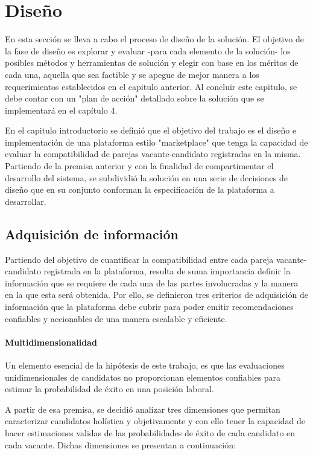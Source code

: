 \chapter{Diseño}
	En esta sección se lleva a cabo el proceso de diseño de la solución. El objetivo de la fase de diseño es explorar y evaluar -para cada elemento de la solución- los posibles métodos y herramientas de solución y elegir con base en los méritos de cada una, aquella que sea factible y se apegue de mejor manera a los requerimientos establecidos en el capitulo anterior. Al concluir este capitulo, se debe contar con un "plan de acción" detallado sobre la solución que se implementará en el capítulo 4.

	En el capitulo introductorio se definió que el objetivo del trabajo es el diseño e implementación de una plataforma estilo "marketplace" que tenga la capacidad de evaluar la compatibilidad de parejas vacante-candidato registradas en la misma. Partiendo de la premisa anterior y con la finalidad de compartimentar el desarrollo del sistema, se subdividió la solución en una serie de decisiones de diseño que en su conjunto conforman la especificación de la plataforma a desarrollar.

	\section{Adquisición de información}
		Partiendo del objetivo de cuantificar la compatibilidad entre cada pareja vacante-candidato registrada en la plataforma, resulta de suma importancia definir la información que se requiere de cada una de las partes involucradas y la manera en la que esta será obtenida. Por ello, se definieron tres criterios de adquisición de información que la plataforma debe cubrir para poder emitir recomendaciones confiables y accionables de una manera escalable y eficiente.

		\subsubsection{Multidimensionalidad}
			Un elemento esencial de la hipótesis de este trabajo, es que las evaluaciones unidimensionales de candidatos no proporcionan elementos confiables para estimar la probabilidad de éxito en una posición laboral.

			A partir de esa premisa, se decidió analizar tres dimensiones que permitan caracterizar candidatos holística y objetivamente y con ello tener la capacidad de hacer estimaciones validas de las probabilidades de éxito de cada candidato en cada vacante. Dichas dimensiones se presentan a continuación:

